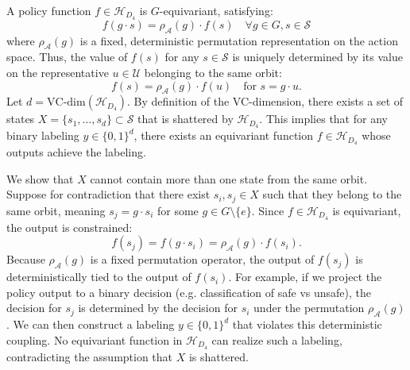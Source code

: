 \documentclass{article}
\begin{document}
A policy function $f \in \mathcal{H}_{D_4}$ is $G$-equivariant, satisfying:
\begin{equation}
    f(g \cdot s) = \rho_{\mathcal{A}}(g) \cdot f(s) \quad \forall g \in G, s \in \mathcal{S}
\end{equation}
where $\rho_{\mathcal{A}}(g)$ is a fixed, deterministic permutation representation on the action space. Thus, the value of $f(s)$ for any $s \in \mathcal{S}$ is uniquely determined by its value on the representative $u \in \mathcal{U}$ belonging to the same orbit:
\begin{equation}
    f(s) = \rho_{\mathcal{A}}(g) \cdot f(u) \quad \text{for } s = g \cdot u.
\end{equation}
Let $d = \mathrm{VC}\text{-}\mathrm{dim}(\mathcal{H}_{D_4})$. By definition of the VC-dimension, there exists a set of states $X = \{s_1, \dots, s_d\} \subset \mathcal{S}$ that is shattered by $\mathcal{H}_{D_4}$. This implies that for any binary labeling $y \in \{0, 1\}^d$, there exists an equivariant function $f \in \mathcal{H}_{D_4}$ whose outputs achieve the labeling.

We show that $X$ cannot contain more than one state from the same orbit. Suppose for contradiction that there exist $s_i, s_j \in X$ such that they belong to the same orbit, meaning $s_j = g \cdot s_i$ for some $g \in G \setminus \{e\}$. Since $f \in \mathcal{H}_{D_4}$ is equivariant, the output is constrained:
\begin{equation}
    f(s_j) = f(g \cdot s_i) = \rho_{\mathcal{A}}(g) \cdot f(s_i).
\end{equation}
Because $\rho_{\mathcal{A}}(g)$ is a fixed permutation operator, the output of $f(s_j)$ is deterministically tied to the output of $f(s_i)$. For example, if we project the policy output to a binary decision (e.g. classification of safe vs unsafe), the decision for $s_j$ is determined by the decision for $s_i$ under the permutation $\rho_{\mathcal{A}}(g)$. We can then construct a labeling $y \in \{0, 1\}^d$ that violates this deterministic coupling. No equivariant function in $\mathcal{H}_{D_4}$ can realize such a labeling, contradicting the assumption that $X$ is shattered.
\end{document}
